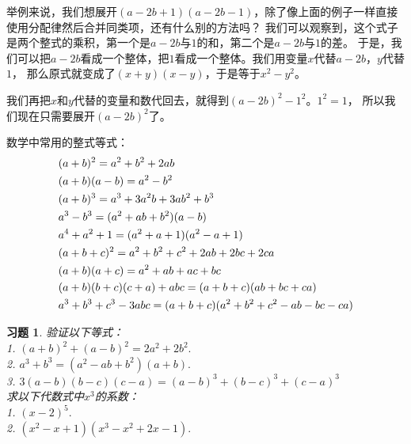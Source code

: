 \documentclass[12pt,UTF8]{ctexbook}
\newtheorem{xt}{习题}[section]
\begin{document}
举例来说，我们想展开$(a - 2b + 1)(a - 2b - 1)$，除了像上面的例子一样直接使用分配律然后合并同类项，还有什么别的方法吗？
我们可以观察到，这个式子是两个整式的乘积，第一个是$a - 2b$与$1$的和，第二个是$a - 2b$与$1$的差。
于是，我们可以把$a - 2b$看成一个整体，把$1$看成一个整体。我们用变量$x$代替$a - 2b$，$y$代替$1$，
那么原式就变成了$(x + y)(x - y)$，于是等于$x^2 - y^2$。

我们再把$x$和$y$代替的变量和数代回去，就得到$(a - 2b)^2 - 1^2$。$1^2 = 1$，
所以我们现在只需要展开$(a - 2b)^2$了。

数学中常用的整式等式：
\begin{align}
    &(a + b)^2 = a^2 + b^2 + 2ab \notag \\
    &(a + b)(a - b) = a^2 - b^2 \notag \\
    &(a + b)^3 = a^3 + 3a^2b + 3ab^2 + b^3 \notag \\
    &a^3 - b^3 = (a^2 + ab + b^2)(a - b) \notag \\
    &a^4 + a^2 + 1 = (a^2+a+1)(a^2-a+1) \notag \\
    &(a + b + c)^2 = a^2 + b^2 + c^2 + 2ab + 2bc + 2ca \notag \\
    &(a + b)(a + c) = a^2 + ab + ac + bc \notag \\
    &(a + b)(b + c)(c + a) + abc = (a + b + c)(ab + bc + ca) \notag \\
    &a^3+b^3+c^3 - 3abc = (a + b + c)(a^2+b^2+c^2-ab-bc-ca) \notag 
\end{align}
\begin{xt}\label{xt:5-0-0}
    验证以下等式：\\
    1. $(a + b)^2 + (a - b)^2 = 2a^2+2b^2.$\\
    2. $a^3+b^3 = (a^2 - ab + b^2)(a + b).$\\
    3. $3(a-b)(b-c)(c-a) = (a-b)^3+(b-c)^3+(c-a)^3$\\
    求以下代数式中$x^3$的系数：\\
    1. $(x - 2)^5.$\\
    2. $(x^2 - x + 1)(x^3 - x^2 +2x - 1).$
\end{xt}
\end{document}

